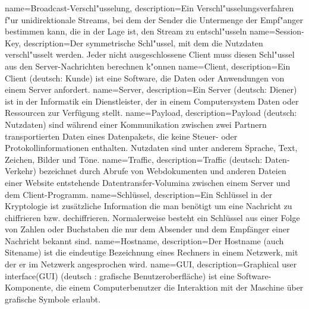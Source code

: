 {
  name=Broadcast-Verschl"usselung,
  description={Ein Verschl"usselungsverfahren f"ur unidirektionale Streams, bei dem der
  Sender die Untermenge der Empf"anger bestimmen kann, die in der Lage ist, den Stream
  zu entschl"usseln}
}
{
  name=Session-Key,
  description={Der symmetrische Schl"ussel, mit dem die Nutzdaten verschl"usselt werden.
  Jeder nicht ausgeschlossene Client muss diesen Schl"ussel aus den Server-Nachrichten
  berechnen k"onnen}
}
{
  name=Client,
  description={Ein Client (deutsch: Kunde) ist eine Software, die Daten oder Anwendungen 
  von einem Server anfordert.}
}
{
  name=Server,
  description={Ein Server (deutsch: Diener) ist in der Informatik ein Dienstleister, 
	der in einem Computersystem Daten oder Ressourcen zur Verfügung stellt.}
}
{
  name=Payload,
  description={Payload (deutsch: Nutzdaten) sind während einer Kommunikation zwischen 
  zwei Partnern transportierten Daten eines Datenpakets, die keine Steuer- oder Protokollinformationen enthalten. 
  Nutzdaten sind unter anderem Sprache, Text, Zeichen, Bilder und Töne.}
}
{
  name=Traffic,
  description={Traffic (deutsch: Daten-Verkehr) bezeichnet durch Abrufe von Webdokumenten 
  und anderen Dateien einer Website entstehende Datentransfer-Volumina zwischen einem Server und dem Client-Programm.}
}
{
  name=Schlüssel,
  description={Ein Schlüssel in der Kryptologie ist zusätzliche Information die man benötigt um eine 
	Nachricht zu chiffrieren bzw. dechiffrieren. Normalerweise besteht ein Schlüssel aus einer Folge von 
	Zahlen oder Buchstaben die nur dem Absender und dem Empfänger einer Nachricht bekannt sind.}
}
{
  name=Hostname,
  description={Der Hostname (auch Sitename) ist die eindeutige Bezeichnung eines Rechners in einem Netzwerk, 
	mit der er im Netzwerk angesprochen wird.}
}
{
  name=GUI,
  description={Graphical user interface(GUI) (deutsch : grafische Benutzeroberfläche) ist eine Software-Komponente, 
	die einem Computerbenutzer die Interaktion mit der Maschine über grafische Symbole erlaubt.}
}

\renewcommand*{\glossaryname}{\section{\glossarName}}

\glsaddall
\printglossaries

